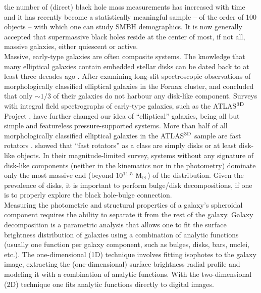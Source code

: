 \documentclass[preprint2]{emulateapj}
\begin{document}
the number of (direct) black hole mass measurements has increased with time 
and it has recently become a statistically meaningful sample -- of the order of 100 objects -- 
with which one can study SMBH demographics. 
It is now generally accepted that supermassive black holes reside at the center of most, if not all, 
massive galaxies, either quiescent or active. \\
Massive, early-type galaxies are often composite systems. 
The knowledge that many elliptical galaxies contain embedded stellar disks can be dated back to 
at least three decades ago 
\citep{capaccioli1987,carter1987,rixwhite1990,bender1990,scorzabender1990,nieto1991,rixwhite1992,scorzabender1995}. 
After examining long-slit spectroscopic observations of morphologically classified elliptical galaxies in the Fornax cluster, 
\cite{donofrio1995} and \cite{graham1998fornax} concluded that only $\sim$$1/3$ of their galaxies do not harbour any disk-like component.
Surveys with integral field spectrographs of early-type galaxies, such as the ATLAS$^{\rm 3D}$ Project \citep{cappellari2011}, 
have further changed our idea of ``elliptical'' galaxies, 
being all but simple and featureless pressure-supported systems.
More than half of all morphologically classified elliptical galaxies in the ATLAS$^{\rm 3D}$ sample are fast rotators \citep{atlas3dIII-MNRAS}.
\cite{krajnovic2013} showed that ``fast rotators'' as a class are simply disks or at least disk-like objects. 
In their magnitude-limited survey, systems 
without any signature of disk-like components (neither in the kinematics nor in the photometry) 
dominate only the most massive end (beyond $10^{11.5}~\rm M_\odot$) of the distribution. 
Given the prevalence of disks, it is important to perform bulge/disk decompositions, 
if one is to properly explore the black hole-bulge connection. \\
Measuring the photometric and structural properties of a galaxy's spheroidal component requires the ability to 
separate it from the rest of the galaxy. 
Galaxy decomposition is a parametric analysis that allows one to fit the surface brightness distribution
of galaxies using a combination of analytic functions (usually one function per
galaxy component, such as bulges, disks, bars, nuclei, etc.).
The one-dimensional (1D) technique involves fitting isophotes to the galaxy image, extracting the (one-dimensional) surface 
brightness radial profile and modeling it with a combination of analytic functions.
With the two-dimensional (2D) technique one fits analytic functions directly to digital images. \\
$$
\end{document}
